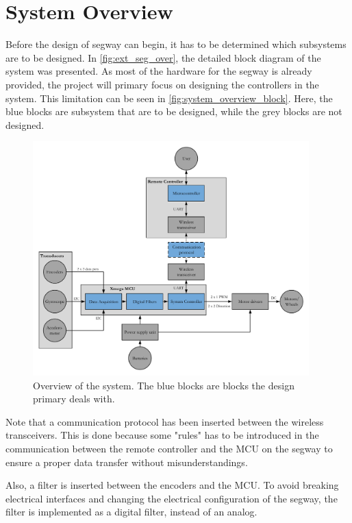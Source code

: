 \section{System Overview}

Before the design of segway can begin, it has to be determined which subsystems are to be designed. In \autoref{fig:ext_seg_over}, the detailed block diagram of the system was presented. As most of the hardware for the segway is already provided, the project will primary focus on designing the controllers in the system. This limitation can be seen in \autoref{fig:system_overview_block}. Here, the blue blocks are subsystem that are to be designed, while the grey blocks are not designed.


\begin{figure}[H]
	\centering
	\includegraphics[width=0.95\textwidth]{design/figures/extendedOverviewGrayedWithInterfaces.pdf}
	\caption{Overview of the system. The blue blocks are blocks the design primary deals with.}
	\label{fig:system_overview_block}
\end{figure}
Note that a communication protocol has been inserted between the wireless transceivers. This is done because some "rules" has to be introduced in the communication between the remote controller and the MCU on the segway to ensure a proper data transfer without misunderstandings.

Also, a filter is inserted between the encoders and the MCU. To avoid breaking electrical interfaces and changing the electrical configuration of the segway, the filter is implemented as a digital filter, instead of an analog.

